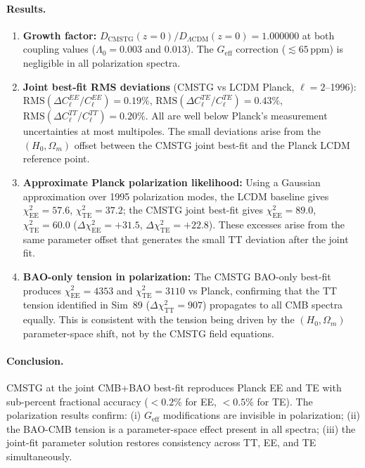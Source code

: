 \documentclass[12pt,a4paper]{article}
\begin{document}
\paragraph{Results.}
\begin{enumerate}
  \item \textbf{Growth factor:} $D_\mathrm{CMSTG}(z=0)/D_{\Lambda\mathrm{CDM}}(z=0)=1.000000$
        at both coupling values ($\Lambda_0=0.003$ and $0.013$). The $G_\mathrm{eff}$
        correction ($\lesssim65\,\mathrm{ppm}$) is negligible in all polarization spectra.

  \item \textbf{Joint best-fit RMS deviations} (CMSTG vs LCDM Planck, $\ell=2$--1996):
        $\mathrm{RMS}(\Delta C_\ell^{EE}/C_\ell^{EE}) = 0.19\%$,
        $\mathrm{RMS}(\Delta C_\ell^{TE}/C_\ell^{TE}) = 0.43\%$,
        $\mathrm{RMS}(\Delta C_\ell^{TT}/C_\ell^{TT}) = 0.20\%$.
        All are well below Planck's measurement uncertainties at most multipoles.
        The small deviations arise from the $(H_0, \Omega_m)$ offset between the
        CMSTG joint best-fit and the Planck LCDM reference point.

  \item \textbf{Approximate Planck polarization likelihood:} Using a Gaussian
        approximation over 1995 polarization modes, the LCDM baseline gives
        $\chi^2_\mathrm{EE}=57.6$, $\chi^2_\mathrm{TE}=37.2$; the CMSTG joint
        best-fit gives $\chi^2_\mathrm{EE}=89.0$, $\chi^2_\mathrm{TE}=60.0$
        ($\Delta\chi^2_\mathrm{EE}=+31.5$, $\Delta\chi^2_\mathrm{TE}=+22.8$).
        These excesses arise from the same parameter offset that generates
        the small TT deviation after the joint fit.

  \item \textbf{BAO-only tension in polarization:} The CMSTG BAO-only best-fit
        produces $\chi^2_\mathrm{EE}=4353$ and $\chi^2_\mathrm{TE}=3110$
        vs Planck, confirming that the TT tension identified in Sim~89
        ($\Delta\chi^2_\mathrm{TT}=907$) propagates to all CMB spectra equally.
        This is consistent with the tension being driven by the
        $(H_0, \Omega_m)$ parameter-space shift, not by the CMSTG field equations.
\end{enumerate}

\paragraph{Conclusion.} CMSTG at the joint CMB+BAO best-fit reproduces Planck
EE and TE with sub-percent fractional accuracy ($<0.2\%$ for EE, $<0.5\%$ for TE).
The polarization results confirm: (i) $G_\mathrm{eff}$ modifications are invisible
in polarization; (ii) the BAO-CMB tension is a parameter-space effect present in
all spectra; (iii) the joint-fit parameter solution restores consistency across
TT, EE, and TE simultaneously.
\end{document}
